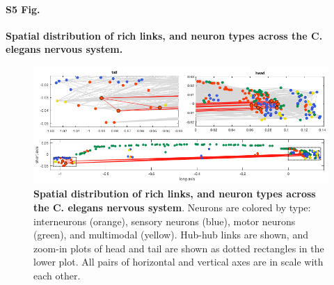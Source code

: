 \documentclass[10pt,letterpaper]{article}
\begin{document}
\paragraph*{S5 Fig.}
{\bf Spatial distribution of rich links, and neuron types across the C. elegans nervous system. }
\begin{figure}[h]
\centering
    \includegraphics[width=1\textwidth]{SpatialPlot.png}
\caption{
\textbf{Spatial distribution of rich links, and neuron types across the C. elegans nervous system}.
Neurons are colored by type: interneurons (orange), sensory neurons (blue), motor neurons (green), and multimodal (yellow).
Hub-hub links are shown, and zoom-in plots of head and tail are shown as dotted rectangles in the lower plot.
All pairs of horizontal and vertical axes are in scale with each other.
\label{fig:S_neuronsSpace}
}
\end{figure}

\end{document}
